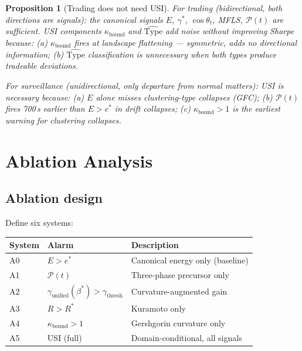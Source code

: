 \documentclass[11pt,a4paper]{article}
\newtheorem{proposition}[theorem]{Proposition}
\theoremstyle{definition}
\begin{document}
\begin{proposition}[Trading does not need USI]
\label{prop:trading_separation}
For trading (bidirectional, both directions are signals):
the canonical signals $E$, $\gamma^*$, $\cos\theta_t$, MFLS, $\mathcal{P}(t)$
are sufficient.
USI components $\kappa_\mathrm{bound}$ and $\widehat{\mathrm{Type}}$ add noise
without improving Sharpe because:
(a) $\kappa_\mathrm{bound}$ fires at landscape flattening --- symmetric,
adds no directional information;
(b) $\widehat{\mathrm{Type}}$ classification is unnecessary when both types
produce tradeable deviations.

For surveillance (unidirectional, only departure from normal matters):
USI is necessary because:
(a) $E$ alone misses clustering-type collapses (GFC);
(b) $\mathcal{P}(t)$ fires 700\,s earlier than $E > e^*$ in drift collapses;
(c) $\kappa_\mathrm{bound} > 1$ is the earliest warning for clustering collapses.
\end{proposition}

\section{Ablation Analysis}
\label{sec:ablations}

\subsection{Ablation design}

Define six systems:

\begin{center}
\begin{tabular}{lll}
\toprule
\textbf{System} & \textbf{Alarm} & \textbf{Description} \\
\midrule
A0 & $E > e^*$ & Canonical energy only (baseline) \\
A1 & $\mathcal{P}(t)$ & Three-phase precursor only \\
A2 & $\gamma_\mathrm{unified}(\beta^*) > \gamma_\mathrm{thresh}$ & Curvature-augmented gain \\
A3 & $R > R^*$ & Kuramoto only \\
A4 & $\kappa_\mathrm{bound} > 1$ & Gershgorin curvature only \\
A5 & USI (full) & Domain-conditional, all signals \\
\bottomrule
\end{tabular}
\end{center}
\end{document}
